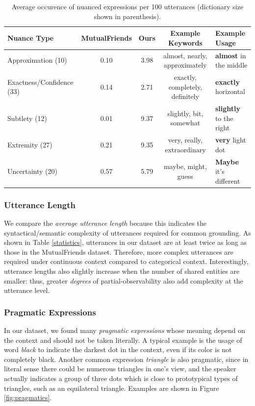 \documentclass[letterpaper]{article} %
\begin{document}
\begin{table}[ht]
\centering
\begin{tabular}{l|cc|c|l}
\toprule
Nuance Type & MutualFriends & Ours & Example Keywords & Example Usage \\
\midrule
Approximation (10) & 0.10 & 3.98 & almost, nearly, approximately & \textbf{almost} in the middle \\
Exactness/Confidence (33) & 0.14 & 2.71 & exactly, completely, definitely & \textbf{exactly} horizontal \\
Subtlety (12) & 0.01 & 9.37 & slightly, bit, somewhat & \textbf{slightly} to the right \\
Extremity (27) & 0.21 & 9.35 & very, really, extraordinary & \textbf{very} light dot \\
Uncertainty (20) & 0.57 & 5.79 & maybe, might, guess & \textbf{Maybe} it's different \\
\bottomrule
\end{tabular}
\caption{\label{nuances}
Average occurence of nuanced expressions per 100 utterances (dictionary size shown in parenthesis).
}
\end{table}

\subsubsection{Utterance Length}

We compare the \emph{average utterance length} because this indicates the syntactical/semantic complexity of utterances required for common grounding. As shown in Table \ref{statistics}, utterances in our dataset are at least twice as long as those in the MutualFriends dataset. Therefore, more complex utterances are required under continuous context compared to categorical context. Interestingly, utterance lengths also slightly increase when the number of shared entities are smaller: thus, greater \emph{degrees} of partial-observability also add complexity at the utterance level.

\subsubsection{Pragmatic Expressions}

In our dataset, we found many \emph{pragmatic expressions} whose meaning depend on the context and should not be taken literally. A typical example is the usage of word \textit{black} to indicate the darkest dot in the context, even if its color is not completely black. Another common expression \textit{triangle} is also pragmatic, since in literal sense there could be numerous triangles in one's view, and the speaker actually indicates a group of three dots which is close to prototypical types of triangles, such as an equilateral triangle. Examples are shown in Figure \ref{fig:pragmatics}.
\end{document}
